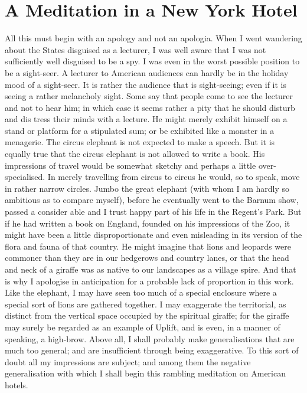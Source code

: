 \documentclass{book}
\begin{document}
\chapter{A Meditation in a New York Hotel}
\label{chapter-1}
All this must begin with an apology and not an apologia. When I went wandering about the States disguised as a lecturer, I was well aware that I was not sufficiently well disguised to be a spy. I was even in the worst possible position to be a sight-seer. A lecturer to American audiences can hardly be in the holiday mood of a sight-seer. It is rather the audience that is sight-seeing; even if it is seeing a rather melancholy sight. Some say that people come to see the lecturer and not to hear him; in which case it seems rather a pity that he should disturb and dis tress their minds with a lecture. He might merely exhibit himself on a stand or platform for a stipulated sum; or be exhibited like a monster in a menagerie. The circus elephant is not expected to make a speech. But it is equally true that the circus elephant is not allowed to write a book. His impressions of travel would be somewhat sketchy and perhaps a little over-specialised. In merely travelling from circus to circus he would, so to speak, move in rather narrow circles. Jumbo the great elephant (with whom I am hardly so ambitious as to compare myself), before he eventually went to the Barnum show, passed a consider able and I trust happy part of his life in the Regent’s Park. But if he had written a book on England, founded on his impressions of the Zoo, it might have been a little disproportionate and even misleading in its version of the flora and fauna of that country. He might imagine that lions and leopards were commoner than they are in our hedgerows and country lanes, or that the head and neck of a giraffe was as native to our landscapes as a village spire. And that is why I apologise in anticipation for a probable lack of proportion in this work. Like the elephant, I may have seen too much of a special enclosure where a special sort of lions are gathered together. I may exaggerate the territorial, as distinct from the vertical space occupied by the spiritual giraffe; for the giraffe may surely be regarded as an example of Uplift, and is even, in a manner of speaking, a high-brow. Above all, I shall probably make generalisations that are much too general; and are insufficient through being exaggerative. To this sort of doubt all my impressions are subject; and among them the negative generalisation with which I shall begin this rambling meditation on American hotels.
\end{document}
